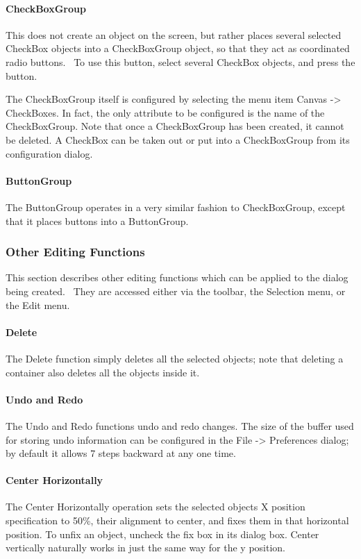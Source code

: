 \paragraph{CheckBoxGroup}
This does not create an object on the screen, but rather
places several selected \textsf{CheckBox} objects into a
\textsf{CheckBoxGroup} object, so that they act as coordinated radio
buttons. \ To use this button, select several \textsf{CheckBox}
objects, and press the button.

The \textsf{CheckBoxGroup} itself is configured by selecting the menu
item Canvas -{\textgreater} CheckBoxes. In fact, the only attribute to
be configured is the name of the \textsf{CheckBoxGroup}. Note that once
a \textsf{CheckBoxGroup} has been created, it cannot be deleted. A
\textsf{CheckBox} can be taken out or put into a \textsf{CheckBoxGroup}
from its configuration dialog.

\paragraph{ButtonGroup}
The \textsf{ButtonGroup} operates in a very similar fashion to
\textsf{CheckBoxGroup}, except that it places buttons into a
\textsf{ButtonGroup}.

\subsubsection{Other Editing Functions}

This section describes other editing functions which can be applied to
the dialog being created. \ They are accessed either via the toolbar,
the Selection menu, or the Edit menu.

\paragraph{Delete}
The Delete function simply deletes all the selected objects; note that
deleting a container also deletes all the objects inside it.

\paragraph{Undo and Redo}
The Undo and Redo functions undo and redo changes. The size of the
buffer used for storing undo information can be configured in the File
-{\textgreater} Preferences dialog; by default it allows 7 steps
backward at any one time.

\paragraph[Center Horizontally]{Center Horizontally}
The Center Horizontally operation sets the selected
objects{\textquotesingle} X position specification to
{\textquotedbl}50\%{\textquotedbl}, their alignment to center, and
fixes them in that horizontal position. To
{\textquotedbl}unfix{\textquotedbl} an object, uncheck the
{\textquotedbl}fix{\textquotedbl} box in its dialog box. Center
vertically naturally works in just the same way for the y position.

